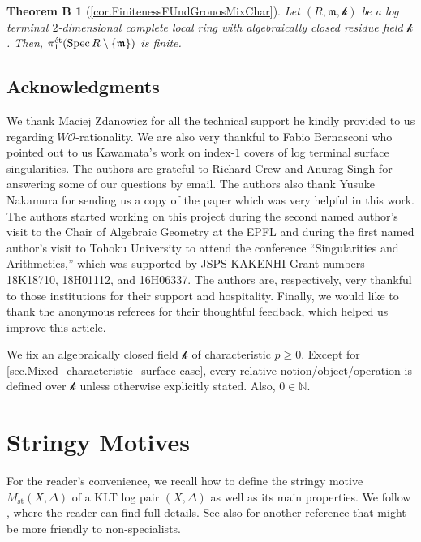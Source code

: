 \documentclass[12pt]{amsart}
\theoremstyle{plain}   %
\newtheorem*{theoremB*}{Theorem B}
\theoremstyle{definition}    %
\theoremstyle{remark}    %
\numberwithin{equation}{theorem}
\DeclareMathOperator{\st}{\mathrm{st}}
\DeclareMathOperator{\Spec}{{Spec}}
\newcommand{\kay}{\mathcal{k}}
\newcommand{\sO}{\mathcal{O}}
\newcommand{\fram}{\mathfrak{m}}
\newcommand{\bN}{\mathbb{N}}
\begin{document}
\begin{theoremB*}[\autoref{cor.FinitenessFUndGrouosMixChar}]
Let $(R,\fram,\kay)$ be a log terminal $2$-dimensional complete local ring with algebraically closed residue field $\kay$. Then, $\pi_1^{\mathrm{\Acute{e}t}}(\Spec R\setminus \{\fram\})$ is finite.
\end{theoremB*}


\subsection*{Acknowledgments} We thank Maciej Zdanowicz for all the technical support he kindly  provided to us regarding $W\sO$-rationality. We are also very thankful to Fabio Bernasconi who pointed out to us Kawamata's work \cite{KawamataIndex1CoversOfLogTerminalSurfaceSingularities} on index-$1$ covers of log terminal surface singularities. The authors are grateful to Richard Crew and Anurag Singh for answering some of our questions by email. The authors also thank Yusuke Nakamura for sending us a copy of the paper \cite{NakamuraShibataInversionOdAdjunctionForQuotientSingularities} which was very helpful in this work. The authors started working on this project during the second named author's visit to the Chair of Algebraic Geometry at the EPFL and during the first named author's visit to Tohoku University to attend the conference ``Singularities and Arithmetics,'' which was supported by JSPS KAKENHI Grant numbers 18K18710, 18H01112, and 16H06337. The authors are, respectively, very thankful to those institutions for their support and hospitality. Finally, we would like to thank the anonymous referees for their thoughtful feedback, which helped us improve this article. 

\begin{convention}
We fix an algebraically closed field $\kay$ of characteristic $p \geq 0$. Except for \autoref{sec.Mixed_characteristic_surface case}, every relative notion/object/operation is defined over $\kay$ unless otherwise explicitly stated. Also, $0 \in \bN$.
\end{convention}

\section{Stringy Motives} \label{sec.StringyMotivicInvaraints}
For the reader's convenience, we recall how to define the stringy motive $M_{\st}(X,\Delta)$ of a KLT log pair $(X,\Delta)$ as well as its main properties. We follow \cite{YasudaMotivicIntegrationDeligneMumfordStack}, where the reader can find full details. See also \cite[Chapter 6]{YasudaBook} for another reference that might be more friendly to non-specialists.
\end{document}
